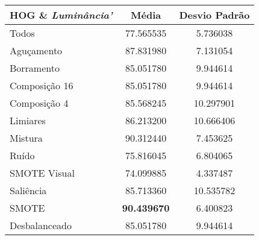 

\begin{table}[!htbp]
\centering
\caption{}
\label{tab:resultados:x:melhor}
\begin{tabular}{|l|c|c|}
\hline
\textbf{HOG  \& \emph{Luminância'}} & \textbf{Média}     & \textbf{Desvio Padrão} \\ \hline
   Todos        &  77.565535  &  5.736038  \\ \hline
  Aguçamento    &  87.831980  &  7.131054  \\ \hline
  Borramento    &  85.051780  &  9.944614  \\ \hline
  Composição 16 &  85.051780  &  9.944614  \\ \hline
  Composição 4  &  85.568245 &  10.297901  \\ \hline
  Limiares      &  86.213200 &  10.666406  \\ \hline
  Mistura       &  90.312440  &  7.453625  \\ \hline
  Ruído         &  75.816045  &  6.804065  \\ \hline
  SMOTE Visual  &  74.099885  &  4.337487  \\ \hline
  Saliência     &  85.713360 &  10.535782  \\ \hline
 SMOTE          &  \textbf{90.439670}  &  6.400823  \\ \hline
Desbalanceado   &  85.051780  &  9.944614  \\ \hline
\end{tabular}
\end{table}

